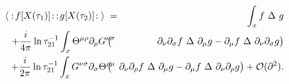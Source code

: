 \documentclass[a4paper,11pt]{article}               \def\new#1\endnew{{\bf #1}}
\let\bra=\langle        \let\ket=\rangle
\newcommand {\cO}{{\cal O}}
\newcommand {\Back}{\!\!\!\!\!}
\newcommand {\tria} {~\Delta~}
\begin{document}
\begin{eqnarray}
  \label{eq:2pCorr}
  \bra\;:\!f[X(\tau_1)]\!: \, :\!g[X(\tau_2)]\!:\;\ket
      \; &=& 
  \int _x f \tria g \nonumber \\
  + \frac i{4\pi} \ln \tau_{21}^{-1}\int _x 
              \Theta^{\mu\rho}\partial_\rho G^{\nu\sigma} 
              \Back &\bigl(& \Back
                    \partial_\nu \partial_\sigma f \tria \partial_\mu g -
                    \partial_\mu f \tria \partial_\nu \partial_\sigma g
              \bigr)  
\nonumber \\
  + \frac i{2\pi} \ln \tau_{21}^{-1}\int _x 
              G^{\nu\sigma}\partial_\sigma \Theta^{\rho\mu}
              \Back &\bigl(& \Back
                    \partial_\nu \partial_\rho f \tria \partial_\mu g -
                    \partial_\mu f \tria \partial_\nu \partial_\rho g
              \bigr)
  + \cO(\partial^2).
\end{eqnarray}
\end{document}
